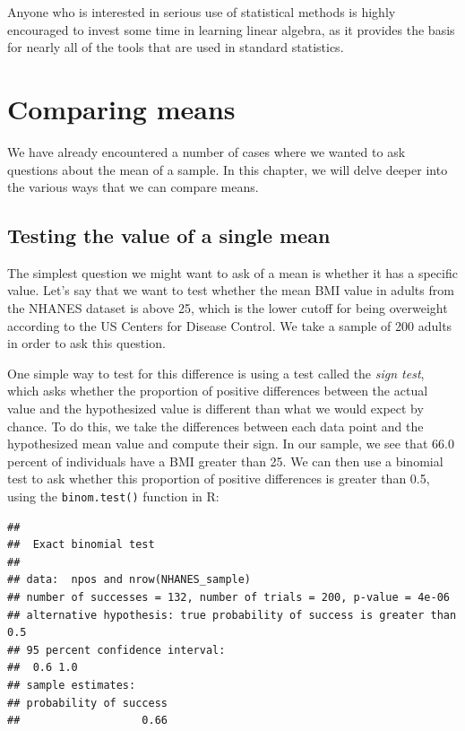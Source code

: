 \documentclass[12pt,]{book}
\theoremstyle{definition}
\theoremstyle{definition}
\theoremstyle{definition}
\theoremstyle{remark}
\begin{document}
Anyone who is interested in serious use of statistical methods is highly encouraged to invest some time in learning linear algebra, as it provides the basis for nearly all of the tools that are used in standard statistics.

\hypertarget{comparing-means}{%
\chapter{Comparing means}\label{comparing-means}}

We have already encountered a number of cases where we wanted to ask questions about the mean of a sample. In this chapter, we will delve deeper into the various ways that we can compare means.

\hypertarget{single-mean}{%
\section{Testing the value of a single mean}\label{single-mean}}

The simplest question we might want to ask of a mean is whether it has a specific value. Let's say that we want to test whether the mean BMI value in adults from the NHANES dataset is above 25, which is the lower cutoff for being overweight according to the US Centers for Disease Control. We take a sample of 200 adults in order to ask this question.

One simple way to test for this difference is using a test called the \emph{sign test}, which asks whether the proportion of positive differences between the actual value and the hypothesized value is different than what we would expect by chance. To do this, we take the differences between each data point and the hypothesized mean value and compute their sign. In our sample, we see that 66.0 percent of individuals have a BMI greater than 25. We can then use a binomial test to ask whether this proportion of positive differences is greater than 0.5, using the \texttt{binom.test()} function in R:

\begin{verbatim}
## 
##  Exact binomial test
## 
## data:  npos and nrow(NHANES_sample)
## number of successes = 132, number of trials = 200, p-value = 4e-06
## alternative hypothesis: true probability of success is greater than 0.5
## 95 percent confidence interval:
##  0.6 1.0
## sample estimates:
## probability of success 
##                   0.66
\end{verbatim}
\end{document}
